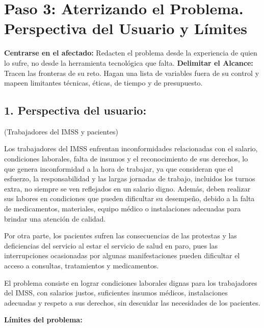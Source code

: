 \documentclass[12pt,letterpaper]{article}
\begin{document}
\section*{Paso 3: Aterrizando el Problema. Perspectiva del Usuario y Límites}

\textbf{Centrarse en el afectado:} Redacten el problema desde la experiencia de quien lo sufre, no desde la herramienta tecnológica que falta. \textbf{Delimitar el Alcance:} Tracen las fronteras de su reto. Hagan una lista de variables fuera de su control y mapeen limitantes técnicas, éticas, de tiempo y de presupuesto.

\subsection*{1. Perspectiva del usuario:}

(Trabajadores del IMSS y pacientes)

Los trabajadores del IMSS enfrentan inconformidades relacionadas con el salario, condiciones laborales, falta de insumos y el reconocimiento de sus derechos, lo que genera inconformidad a la hora de trabajar, ya que consideran que el esfuerzo, la responsabilidad y las largas jornadas de trabajo, incluidos los turnos extra, no siempre se ven reflejados en un salario digno. Además, deben realizar sus labores en condiciones que pueden dificultar su desempeño, debido a la falta de medicamentos, materiales, equipo médico o instalaciones adecuadas para brindar una atención de calidad.

Por otra parte, los pacientes sufren las consecuencias de las protestas y las deficiencias del servicio al estar el servicio de salud en paro, pues las interrupciones ocasionadas por algunas manifestaciones pueden dificultar el acceso a consultas, tratamientos y medicamentos.

El problema consiste en lograr condiciones laborales dignas para los trabajadores del IMSS, con salarios justos, suficientes insumos médicos, instalaciones adecuadas y respeto a sus derechos, sin descuidar las necesidades de los pacientes.

\textbf{Límites del problema:}
\end{document}
